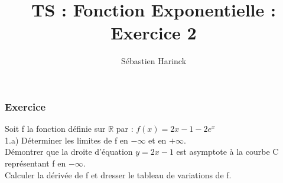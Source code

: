 \documentclass[t]{beamer}
\title{TS : Fonction Exponentielle : Exercice 2}
\author{Sébastien Harinck}
\institute{www.cours-futes.com}
\date{}
\begin{document}
\begin{frame}
\titlepage
\end{frame}

\begin{frame}
\frametitle{Exercice}
\pause
Soit f la fonction définie sur $ \mathbb{R} $ par :
\pause
\( f(x) = 2x-1-2e^x \) \\
\pause
1.a) Déterminer les limites de f en $ - \infty $ et en $ + \infty $. \\
\pause
Démontrer que la droite d'équation $ y = 2x-1 $ est asymptote à la courbe C représentant f en $ - \infty $. \\
\pause
Calculer la dérivée de f et dresser le tableau de variations de f. 
\end{frame}
\end{document}
